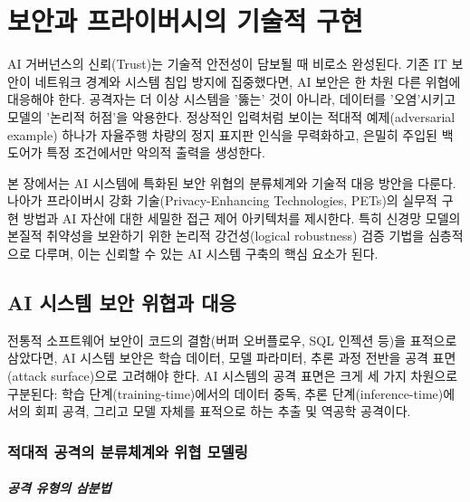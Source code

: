 
\chapter{보안과 프라이버시의 기술적 구현}
\label{ch:security_privacy}

AI 거버넌스의 신뢰(Trust)는 기술적 안전성이 담보될 때 비로소 완성된다. 기존 IT 보안이 네트워크 경계와 시스템 침입 방지에 집중했다면, AI 보안은 한 차원 다른 위협에 대응해야 한다. 공격자는 더 이상 시스템을 '뚫는' 것이 아니라, 데이터를 '오염'시키고 모델의 '논리적 허점'을 악용한다. 정상적인 입력처럼 보이는 적대적 예제(adversarial example) 하나가 자율주행 차량의 정지 표지판 인식을 무력화하고, 은밀히 주입된 백도어가 특정 조건에서만 악의적 출력을 생성한다.

본 장에서는 AI 시스템에 특화된 보안 위협의 분류체계와 기술적 대응 방안을 다룬다. 나아가 프라이버시 강화 기술(Privacy-Enhancing Technologies, PETs)의 실무적 구현 방법과 AI 자산에 대한 세밀한 접근 제어 아키텍처를 제시한다. 특히 신경망 모델의 본질적 취약성을 보완하기 위한 논리적 강건성(logical robustness) 검증 기법을 심층적으로 다루며, 이는 신뢰할 수 있는 AI 시스템 구축의 핵심 요소가 된다.

\section{AI 시스템 보안 위협과 대응}
\label{sec:15.1}

전통적 소프트웨어 보안이 코드의 결함(버퍼 오버플로우, SQL 인젝션 등)을 표적으로 삼았다면, AI 시스템 보안은 학습 데이터, 모델 파라미터, 추론 과정 전반을 공격 표면(attack surface)으로 고려해야 한다. AI 시스템의 공격 표면은 크게 세 가지 차원으로 구분된다: 학습 단계(training-time)에서의 데이터 중독, 추론 단계(inference-time)에서의 회피 공격, 그리고 모델 자체를 표적으로 하는 추출 및 역공학 공격이다.

\subsection{적대적 공격의 분류체계와 위협 모델링}
\label{sec:15.1.1}

\paragraph{공격 유형의 삼분법}

